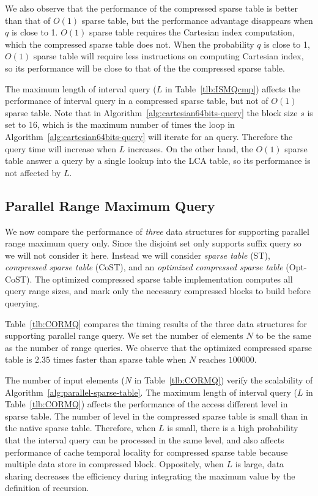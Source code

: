 We also observe that the performance of the compressed sparse table is
better than that of $O(1)$ sparse table, but the performance advantage
disappears when $q$ is close to 1. $O(1)$ sparse table requires the
Cartesian index computation, which the compressed sparse table does not.
When the probability $q$ is close to 1, $O(1)$ sparse table will require
less instructions on computing Cartesian index, so its performance will
be close to that of the the compressed sparse table.

The maximum length of interval query ($L$ in Table~\ref{tlb:ISMQcmp})
affects the performance of interval query in a compressed sparse table,
but not of $O(1)$ sparse table.  Note that in
Algorithm~\ref{alg:cartesian64bits-query} the block size $s$ is set to
16, which is the maximum number of times the loop in
Algorithm~\ref{alg:cartesian64bits-query} will iterate for an query.
Therefore the query time will increase when $L$ increases.  On the other
hand, the $O(1)$ sparse table answer a query by a single lookup into the
LCA table, so its performance is not affected by $L$.


\subsection{Parallel Range Maximum Query}

We now compare the performance of {\em three} data structures for
supporting parallel range maximum query only.  Since the disjoint set
only supports suffix query so we will not consider it here.  Instead we
will consider {\em sparse table} ({\sc ST}), {\em compressed sparse
table} ({\sc CoST}), and an {\em optimized compressed sparse table}
({\sc Opt-CoST}). The optimized compressed sparse table implementation
computes all query range sizes, and mark only the necessary compressed
blocks to build before querying.

Table~\ref{tlb:CORMQ} compares the timing results of the three data
structures for supporting parallel range query.  We set the number of
elements $N$ to be the same as the number of range queries.  We observe
that the optimized compressed sparse table is $2.35$ times faster than
sparse table when $N$ reaches $100000$.


The number of input elements ($N$ in Table~\ref{tlb:CORMQ}) verify the
scalability of Algorithm~\ref{alg:parallel-sparse-table}.  The maximum
length of interval query ($L$ in Table~\ref{tlb:CORMQ}) affects the
performance of the access different level in sparse table. The number of
level in the compressed sparse table is small than in the native sparse
table.  Therefore, when $L$ is small, there is a high probability that
the interval query can be processed in the same level, and also affects
performance of cache temporal locality for compressed sparse table
because multiple data store in compressed block. Oppositely, when $L$ is
large, data sharing decreases the efficiency during integrating the
maximum value by the definition of recursion.


